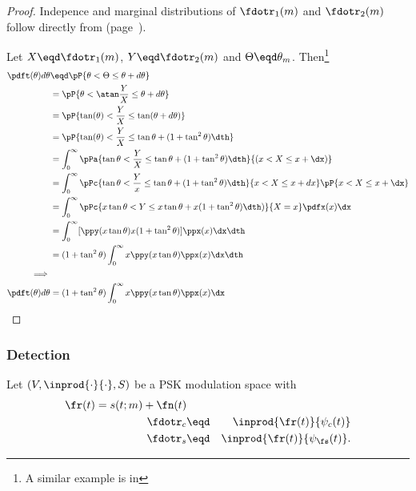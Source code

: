 {\begin{proof}

Indepence and marginal distributions of $\fdotr_1(m)$ and $\fdotr_2(m)$
follow directly from
 (page~\pageref{thm:ms_stats}).


Let $X\eqd\fdotr_1(m)$, $Y\eqd\fdotr_2(m)$ and $\Theta\eqd\theta_m$.
Then\footnote{A similar example is in }
\begin{align*}
   \pdft(\theta)d\theta
     &\eqd \pP{\theta < \Theta \le \theta + d\theta}
   \\&=    \pP{\theta < \atan\frac{Y}{X} \le \theta + d\theta}
   \\&=    \pP{\tan(\theta) < \frac{Y}{X} \le \tan(\theta + d\theta)}
   \\&=    \pP{\tan(\theta) < \frac{Y}{X} \le \tan\theta + (1+\tan^2\theta)\dth}
   \\&=    \int_0^\infty \pPa{\tan\theta < \frac{Y}{X} \le \tan\theta + (1+\tan^2\theta)\dth}{(x<X\le x+\dx)}
   \\&=    \int_0^\infty \pPc{\tan\theta < \frac{Y}{x} \le \tan\theta + (1+\tan^2\theta)\dth}{x<X\le x+dx}\pP{x<X\le x+\dx}
   \\&=    \int_0^\infty \pPc{x\tan\theta < Y \le x\tan\theta + x(1+\tan^2\theta)\dth)}{X=x} \pdfx(x)\dx
   \\&=    \int_0^\infty [\ppy(x\tan\theta)x(1+\tan^2\theta)] \ppx(x) \dx \dth
   \\&=    (1+\tan^2\theta) \int_0^\infty x\ppy(x\tan\theta) \ppx(x) \dx \dth
\\\implies\\
   \pdft(\theta)d\theta
     &= (1+\tan^2\theta) \int_0^\infty x\ppy(x\tan\theta) \ppx(x) \dx
\end{align*}
\attention
\end{proof}



\subsubsection{Detection}
\begin{theorem}
Let $(V,\inprod{\cdot}{\cdot},S)$ be a PSK modulation space with
\begin{align*}
   \fr(t) = s(t;m)+\fn(t) \\
   \fdotr_c &\eqd& \inprod{\fr(t)}{\psi_c(t)} \\
   \fdotr_s &\eqd& \inprod{\fr(t)}{\psi_\fs(t)}.
\end{align*}


\end{theorem}}
